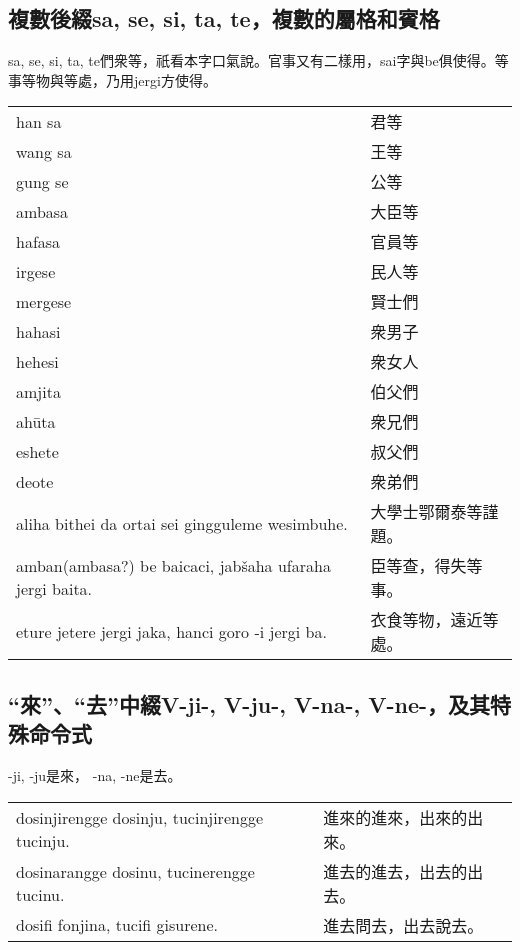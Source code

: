 \documentclass{article}
\begin{document}
\subsection{複數後綴sa, se, si, ta, te，複數的屬格和賓格}
\noindent sa, se, si, ta, te們衆等，祇看本字口氣說。官事又有二樣用，sai字與be俱使得。等事等物與等處，乃用jergi方使得。
\begin{center}
    \begin{tabularx}{\textwidth}{XX}
     han sa &君等\\ wang sa &王等\\gung se&公等\\ambasa&大臣等\\hafasa&官員等\\irgese&民人等\\mergese&賢士們\\hahasi&衆男子\\hehesi&衆女人\\amjita&伯父們\\ah\={u}ta&衆兄們\\eshete&叔父們\\deote&衆弟們\\
     aliha bithei da ortai sei gingguleme wesimbuhe.&大學士鄂爾泰等謹題。\\
     amban(ambasa?) be baicaci, jab\v{s}aha ufaraha jergi baita.&臣等查，得失等事。\\
     eture jetere jergi jaka, hanci goro -i jergi ba.&衣食等物，遠近等處。
    \end{tabularx}
\end{center}

\subsection{“來”、“去”中綴V-ji-, V-ju-, V-na-, V-ne-，及其特殊命令式}
\noindent -ji, -ju是來， -na, -ne是去。
\begin{center}
    \begin{tabularx}{\textwidth}{XX}
     dosinjirengge dosinju, tucinjirengge tucinju.&進來的進來，出來的出來。\\
     dosinarangge dosinu, tucinerengge tucinu.&進去的進去，出去的出去。\\
     dosifi fonjina, tucifi gisurene.&進去問去，出去說去。
    \end{tabularx}
\end{center}
\end{document}
